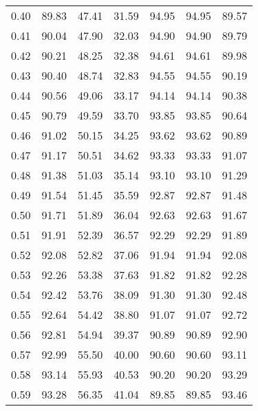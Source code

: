 \begin{tabular}{|c|c|c|c|c|c|c|}
      0.40 &     89.83 &     47.41 &      31.59 &   94.95 &      94.95 &         89.57 \\
      0.41 &     90.04 &     47.90 &      32.03 &   94.90 &      94.90 &         89.79 \\
      0.42 &     90.21 &     48.25 &      32.38 &   94.61 &      94.61 &         89.98 \\
      0.43 &     90.40 &     48.74 &      32.83 &   94.55 &      94.55 &         90.19 \\
      0.44 &     90.56 &     49.06 &      33.17 &   94.14 &      94.14 &         90.38 \\
      0.45 &     90.79 &     49.59 &      33.70 &   93.85 &      93.85 &         90.64 \\
      0.46 &     91.02 &     50.15 &      34.25 &   93.62 &      93.62 &         90.89 \\
      0.47 &     91.17 &     50.51 &      34.62 &   93.33 &      93.33 &         91.07 \\
      0.48 &     91.38 &     51.03 &      35.14 &   93.10 &      93.10 &         91.29 \\
      0.49 &     91.54 &     51.45 &      35.59 &   92.87 &      92.87 &         91.48 \\
      0.50 &     91.71 &     51.89 &      36.04 &   92.63 &      92.63 &         91.67 \\
      0.51 &     91.91 &     52.39 &      36.57 &   92.29 &      92.29 &         91.89 \\
      0.52 &     92.08 &     52.82 &      37.06 &   91.94 &      91.94 &         92.08 \\
      0.53 &     92.26 &     53.38 &      37.63 &   91.82 &      91.82 &         92.28 \\
      0.54 &     92.42 &     53.76 &      38.09 &   91.30 &      91.30 &         92.48 \\
      0.55 &     92.64 &     54.42 &      38.80 &   91.07 &      91.07 &         92.72 \\
      0.56 &     92.81 &     54.94 &      39.37 &   90.89 &      90.89 &         92.90 \\
      0.57 &     92.99 &     55.50 &      40.00 &   90.60 &      90.60 &         93.11 \\
      0.58 &     93.14 &     55.93 &      40.53 &   90.20 &      90.20 &         93.29 \\
      0.59 &     93.28 &     56.35 &      41.04 &   89.85 &      89.85 &         93.46 \\

\end{tabular}
